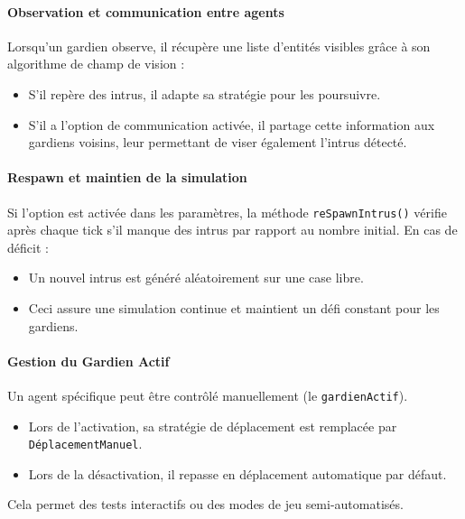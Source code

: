\vspace{1em}
\paragraph{Observation et communication entre agents}

Lorsqu'un gardien observe, il récupère une liste d'entités visibles grâce à son algorithme de champ de vision :
\begin{itemize}
    \item S'il repère des intrus, il adapte sa stratégie pour les poursuivre.
    \item S'il a l'option de communication activée, il partage cette information aux gardiens voisins, leur permettant de viser également l'intrus détecté.
\end{itemize}

\vspace{1em}
\paragraph{Respawn et maintien de la simulation}

Si l’option est activée dans les paramètres, la méthode \texttt{reSpawnIntrus()} vérifie après chaque tick s’il manque des intrus par rapport au nombre initial. En cas de déficit :
\begin{itemize}
    \item Un nouvel intrus est généré aléatoirement sur une case libre.
    \item Ceci assure une simulation continue et maintient un défi constant pour les gardiens.
\end{itemize}

\vspace{1em}
\paragraph{Gestion du Gardien Actif}

Un agent spécifique peut être contrôlé manuellement (le \texttt{gardienActif}). 
\begin{itemize}
    \item Lors de l’activation, sa stratégie de déplacement est remplacée par \texttt{DéplacementManuel}.
    \item Lors de la désactivation, il repasse en déplacement automatique par défaut.
\end{itemize}
Cela permet des tests interactifs ou des modes de jeu semi-automatisés.

